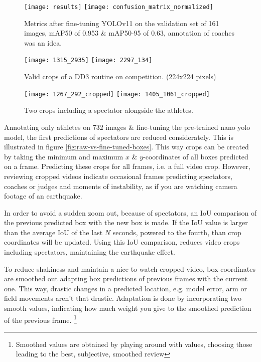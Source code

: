 \begin{figure}
    \centering
    \texttt{[image: results]}
    \texttt{[image: confusion\_matrix\_normalized]}
    \caption[metrics after fine-tuning YOLOv11]{Metrics after fine-tuning YOLOv11 on the validation set of 161 images, mAP50 of 0.953 \& mAP50-95 of 0.63, annotation of coaches was an idea.}
    \label{fig:localization-results}
\end{figure}

\begin{figure}
    \centering
    \texttt{[image: 1315\_2935]}
    \texttt{[image: 2297\_134]}
    \caption[Valid crops of a DD3 routine on competition.]{Valid crops of a DD3 routine on competition. (224x224 pixels)}
    \label{fig:dd3-crop}
\end{figure}

\begin{figure}
    \centering
    \texttt{[image: 1267\_292\_cropped]}
    \texttt{[image: 1405\_1061\_cropped]}
    \caption[dd3-crop-error]{Two crops including a spectator alongside the athletes.}
    \label{fig:dd3-crop-error}
\end{figure}

Annotating only athletes on 732 images \& fine-tuning the pre-trained nano yolo model, the first predictions of spectators are reduced considerately. This is illustrated in figure \ref{fig:raw-vs-fine-tuned-boxes}.
This way crops can be created by taking the minimum and maximum \(x\) \& \(y\)-coordinates of all boxes predicted on a frame. Predicting these crops for all frames, i.e. a full video crop.
However, reviewing cropped videos indicate occasional frames predicting spectators, coaches or judges and moments of instability, as if you are watching camera footage of an earthquake.

In order to avoid a sudden zoom out, because of spectators, an IoU comparison of the previous predicted box with the new box is made. If the IoU value is larger than the average IoU of the last \(N\) seconds, powered to the fourth, than crop coordinates will be updated. Using this IoU comparison, reduces video crops including spectators, maintaining the earthquake effect.


To reduce shakiness and maintain a nice to watch cropped video, box-coordinates are smoothed out adapting box predictions of previous frames with the current one. This way, drastic changes in a predicted location, e.g. model error, arm or field movements aren't that drastic. Adaptation is done by incorporating two smooth values, indicating how much weight you give to the smoothed prediction of the previous frame. \footnote{Smoothed values are obtained by playing around with values, choosing those leading to the best, subjective, smoothed review}

